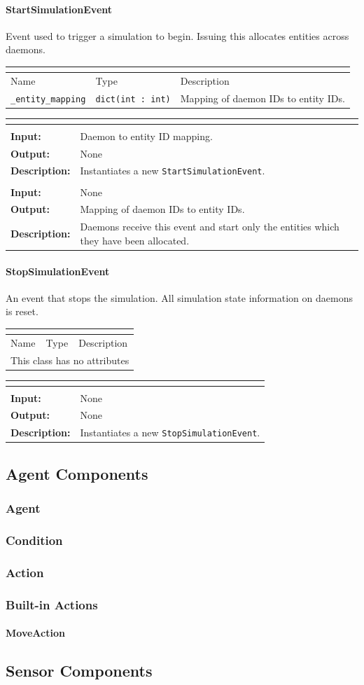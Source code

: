 \documentclass[titlepage]{article}
\newcommand{\operations}[1]{
\begin{center}
    \begin{longtable}{|p{4cm}|p{10cm + 2.0\tabcolsep}|}
    \hline
    \multicolumn{2}{|l|}{\cellcolor[gray]{0.5}{\textbf{Operations}}} \\ \hline
#1
    \end{longtable}
\end{center}
}
\newcommand{\operation}[4]{
    \hline
    \multicolumn{2}{|l|}{\cellcolor[gray]{0.8}{\texttt{#1}}} \\ \hline
    \hspace{7pt}\textbf{Input:} & #2 \\ \hline
    \hspace{7pt}\textbf{Output:} & #3 \\ \hline
    \hspace{7pt}\textbf{Description:} & #4 \\ \hline
}
\newcommand{\noattributes}{
    \begin{center}
        \begin{tabular}{|p{3cm}|p{3cm}|p{8cm}|}
            \multicolumn{3}{|l|}{\cellcolor[gray]{0.5}{\textbf{Attributes}}} \\ \hline
            \rowcolor[gray]{0.8} Name & Type & Description \\ \hline 
            \multicolumn{3}{|c|}{This class has no attributes} \\ \hline
        \end{tabular}
    \end{center}
}
\newcommand{\attributes}[1]{
    \begin{center}
        \begin{tabular}{|p{3cm}|p{3cm}|p{8cm}|}
            \multicolumn{3}{|l|}{\cellcolor[gray]{0.5}{\textbf{Attributes}}} \\ \hline
            \rowcolor[gray]{0.8} Name & Type & Description \\ \hline 
            #1
        \end{tabular}
    \end{center}
}
\newcommand{\attribute}[3]{
    \texttt{#1} & \texttt{#2} & #3 \\ \hline
}
\begin{document}
\paragraph{StartSimulationEvent}{Event used to trigger a simulation to begin.  Issuing this allocates entities across daemons.}
\attributes
{
    \attribute{\_entity\_mapping}{dict(int : int)}{Mapping of daemon IDs to entity IDs.}
}

\operations
{
    \operation{\_\_init\_\_(entity\_mapping)}{Daemon to entity ID mapping.}{None}{Instantiates a new \texttt{StartSimulationEvent}.}
    \operation{get\_mapping()}{None}{Mapping of daemon IDs to entity IDs.}{Daemons receive this event and start only the entities which they have been allocated.}
}

\paragraph{StopSimulationEvent}{An event that stops the simulation.  All simulation state information on daemons is reset.}

\noattributes

\operations
{
    \operation{\_\_init\_\_()}{None}{None}{Instantiates a new \texttt{StopSimulationEvent}.}
}

\subsection{Agent Components}
\subsubsection{Agent}
\subsubsection{Condition}
\subsubsection{Action}

\subsubsection{Built-in Actions}
\paragraph{MoveAction}

\subsection{Sensor Components}
\end{document}
